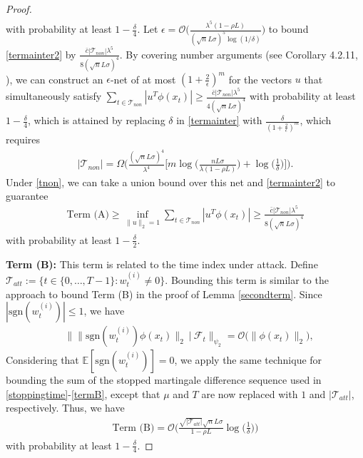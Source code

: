 \documentclass[letterpaper,10pt,conference]{ieeeconf}
\theoremstyle{plain} %
\theoremstyle{plain} %
\theoremstyle{plain} %
\theoremstyle{plain}
\begin{document}
\begin{proof}
\begin{align*}
\end{align*}
with probability at least $1-\frac{\delta}{4}$. Let $\epsilon = \mathcal{O}\bigr(\frac{\lambda^5 (1-\rho L)}{(\sqrt{n}L\sigma)^5 \log(1/\delta)}  \bigr)$ to bound \eqref{termainter2} by $\frac{\bar c |\mathcal{T}_{non}|\lambda^5}{8(\sqrt{n}L\sigma)^4}$. By covering number arguments (see   Corollary 4.2.11, \cite{vershynin2025high}), we can construct an $\epsilon$-net of at most  $(1+\frac{2}{\epsilon})^m$ for the vectors $u$ that simultaneously satisfy $\sum_{t\in \mathcal{T}_{non}}|u^T\phi(x_t)|\ge \frac{\bar c |\mathcal{T}_{non}|\lambda^5}{4(\sqrt{n}L\sigma)^4}$ with probability at least $1-\frac{\delta}{4}$, which is attained by replacing $\delta$ in \eqref{termainter} with $\frac{\delta}{(1+\frac{2}{\epsilon})^m}$, which requires 
\begin{align}\label{tnon}
    |\mathcal{T}_{non}| = \Omega\Bigr(\frac{(\sqrt{n}L\sigma)^4}{\lambda^4}\Bigr[m\log\Bigr( \frac{nL\sigma }{\lambda(1-\rho L)}\Bigr) + \log\Bigr(\frac{1}{\delta}\Bigr) \Bigr]\Bigr).
\end{align}
Under \eqref{tnon}, we can take a union bound over this net and  \eqref{termainter2} to guarantee \begin{align}\label{tnonf}
 \text{Term (A)} \ge  \inf_{\|u\|_2=1}  \sum_{t\in \mathcal{T}_{non}}|u^T\phi(x_t)|\ge \frac{\bar c |\mathcal{T}_{non}|\lambda^5}{8(\sqrt{n}L\sigma)^4}
\end{align}
with probability at least $1-\frac{\delta}{2}$. 

\medskip
\textbf{Term (B):} This term is related to the time index under attack. Define $\mathcal{T}_{att}:= \{t\in\{0,\dots, T-1\}: w_t^{(i)}\ne 0\}$. 
Bounding this term is similar to the approach to bound Term (B) in the proof of Lemma \ref{secondterm}. Since $|\mathrm{sgn}(w_t^{(i)})|\le 1$, 
 we have 
    \begin{align*}
  &\bigr\|  \|\mathrm{sgn}(w_t^{(i)}) \phi(x_t)\|_2~\bigr|~\mathcal{F}_t\bigr\|_{\psi_2} =\mathcal{O} \bigr( \|\phi(x_t)\|_2\bigr),
\end{align*}
Considering that 
$\mathbb{E}[\mathrm{sgn}(w_t^{(i)})] = 0$, we apply the same technique for bounding the sum of the stopped martingale difference sequence used in \eqref{stoppingtime}-\eqref{termB}, except that $\mu$ and $T$ are now replaced with $1$ and $|\mathcal{T}_{att}|$, respectively. Thus, we have 
\begin{align}\label{tattf}
    \text{Term (B)} = \mathcal{O}\Bigr(  \frac{\sqrt{|\mathcal{T}_{att}|} \sqrt{n}L\sigma}{1-\rho L}\log\Bigr(\frac{1}{\delta}\Bigr)   \Big)
\end{align}
with probability at least $1-\frac{\delta}{4}$. 


\end{proof}
\end{document}
